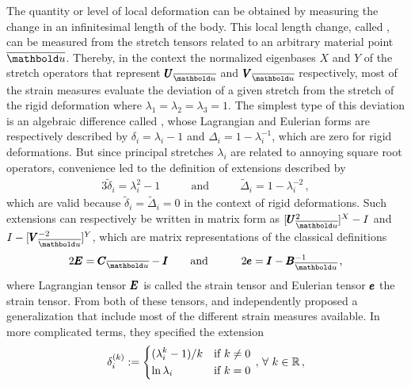 The quantity or level of local deformation can be obtained by measuring the change in an infinitesimal length of the body. This local length change, called , can be measured from the stretch tensors related to an arbitrary material point $\overline{\vto{u}}$. Thereby, in the context the normalized eigenbases $X$ and $Y$ of the stretch operators that represent $\tnr{U}_{\overline{\vto{u}}}$ and $\tnr{V}_{\overline{\vto{u}}}$ respectively, most of the strain measures evaluate the deviation of a given stretch from the stretch of the rigid deformation where $\lambda_1=\lambda_2=\lambda_3=1$. The simplest type of this deviation is an algebraic difference called , whose Lagrangian and Eulerian forms are respectively described by $\delta_i=\lambda_i-1$ and $\Delta_i=1-\lambda_i^{-1}$, which are zero for rigid deformations. But since principal stretches $\lambda_i$ are related to annoying square root operators, convenience led to the definition of extensions described by 
\begin{alignat}{3}
\tilde{\delta}_i=\lambda_i^2-1&\qquad \text{and}\qquad & \tilde{\Delta}_i=1-\lambda_i^{-2}\,,
\end{alignat}
which are valid because $\tilde{\delta}_i=\tilde{\Delta}_i=0$ in the context of rigid deformations. Such extensions can respectively be written in matrix form as $[\tnr{U}_{\overline{\vto{u}}}^2]^X-I$ and $I-[\tnr{V}_{\overline{\vto{u}}}^{-2}]^Y$, which are matrix representations of the classical definitions 
\begin{alignat}{3}
2\tnr{E}=\tnr{C}_{\overline{\vto{u}}}-\tnr{I}&\qquad \text{and}\qquad & 2\tnr{e}=\tnr{I}-\tnr{B}_{\overline{\vto{u}}}^{-1}\,,
\end{alignat}
where Lagrangian tensor $\pmb{E}$ is called the  strain tensor and Eulerian tensor $\pmb{e}$ the  strain tensor. From both of these tensors, \cite{doyle_1956} and \cite{seth_1961} independently proposed a generalization that include most of the different strain measures available. In more complicated terms, they specified the extension
\begin{alignat}{3}
\delta_i^{(k)}:=\begin{dcases}
(\lambda_i^k-1)/k &  \text{if } k\neq 0\\
\ln{\lambda_i}&  \text{if } k=0
\end{dcases}\,,\, \forall \,\, k\in\mathbb{R}\,,
\end{alignat}
